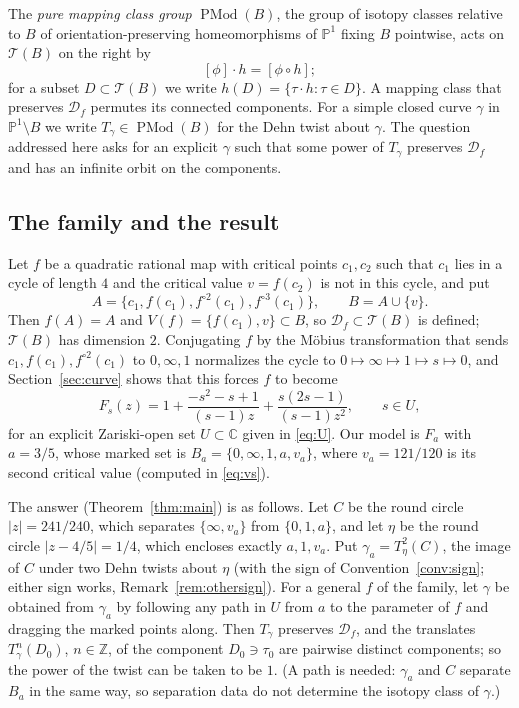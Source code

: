 \documentclass[11pt]{article}
\newcommand{\Pone}{\mathbb P^1}
\newcommand{\C}{\mathbb C}
\newcommand{\Z}{\mathbb Z}
\newcommand{\Teich}{\mathcal T}
\newcommand{\D}{\mathcal D}
\newcommand{\PMod}{\operatorname{PMod}}
\theoremstyle{remark}
\numberwithin{equation}{section}
\begin{document}
The \emph{pure mapping class group} $\PMod(B)$, the group of isotopy classes
relative to $B$ of orientation-preserving homeomorphisms of $\Pone$ fixing
$B$ pointwise, acts on $\Teich(B)$ on the right by
\begin{equation}\label{eq:rightaction}
 [\phi]\cdot h=[\phi\circ h];
\end{equation}
for a subset $D\subset\Teich(B)$ we write $h(D)=\{\tau\cdot h:\tau\in D\}$.
A mapping class that preserves $\D_f$ permutes its connected components.
For a simple closed curve $\gamma$ in $\Pone\setminus B$ we write
$T_\gamma\in\PMod(B)$ for the Dehn twist about $\gamma$. The question
addressed here asks for an explicit $\gamma$ such that some power of
$T_\gamma$ preserves $\D_f$ and has an infinite orbit on the components.

\subsection{The family and the result}\label{sec:family}

Let $f$ be a quadratic rational map with critical points $c_1,c_2$ such that
$c_1$ lies in a cycle of length $4$ and the critical value $v=f(c_2)$ is not
in this cycle, and put
\[
 A=\{c_1,f(c_1),f^{\circ2}(c_1),f^{\circ3}(c_1)\},\qquad B=A\cup\{v\}.
\]
Then $f(A)=A$ and $V(f)=\{f(c_1),v\}\subset B$, so $\D_f\subset\Teich(B)$ is
defined; $\Teich(B)$ has dimension $2$. Conjugating $f$ by the M\"obius
transformation that sends $c_1,f(c_1),f^{\circ2}(c_1)$ to $0,\infty,1$
normalizes the cycle to $0\mapsto\infty\mapsto1\mapsto s\mapsto0$, and
Section~\ref{sec:curve} shows that this forces $f$ to become
\begin{equation}\label{eq:family}
 F_s(z)=1+\frac{-s^2-s+1}{(s-1)z}+\frac{s(2s-1)}{(s-1)z^2},
 \qquad s\in U,
\end{equation}
for an explicit Zariski-open set $U\subset\C$ given in \eqref{eq:U}.  Our
model is $F_a$ with $a=3/5$, whose marked set is
$B_a=\{0,\infty,1,a,v_a\}$, where $v_a=121/120$ is its second critical
value (computed in \eqref{eq:vs}).

The answer (Theorem~\ref{thm:main}) is as follows. Let $C$ be the round
circle $|z|=241/240$, which separates $\{\infty,v_a\}$ from $\{0,1,a\}$,
and let $\eta$ be the round circle $|z-4/5|=1/4$, which encloses exactly
$a,1,v_a$. Put $\gamma_a=T_\eta^{2}(C)$, the image of $C$ under two Dehn
twists about $\eta$ (with the sign of Convention~\ref{conv:sign}; either
sign works, Remark~\ref{rem:othersign}). For a general $f$ of the family,
let $\gamma$ be obtained from $\gamma_a$ by following any path in $U$ from
$a$ to the parameter of $f$ and dragging the marked points along. Then
$T_\gamma$ preserves $\D_f$, and the translates $T_\gamma^{n}(D_0)$,
$n\in\Z$, of the component $D_0\ni\tau_0$ are pairwise distinct
components; so the power of the twist can be taken to be $1$. (A path is
needed: $\gamma_a$ and $C$ separate $B_a$ in the same way, so separation
data do not determine the isotopy class of $\gamma$.)
\end{document}
